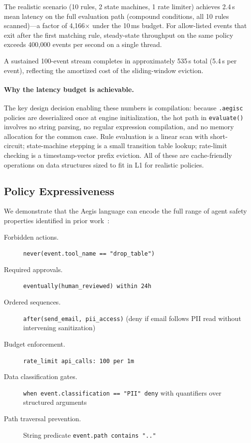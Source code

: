 \documentclass[sigconf]{acmart}
\begin{document}
The realistic scenario (10 rules, 2 state machines, 1 rate limiter) achieves
2.4\,\textmu s mean latency on the full evaluation path (compound conditions,
all 10 rules scanned)---a factor of 4,166$\times$ under the 10\,ms budget.
For allow-listed events that exit after the first matching rule, steady-state
throughput on the same policy exceeds 400{,}000 events per second on a single
thread.

A sustained 100-event stream completes in approximately 535\,\textmu s total
(5.4\,\textmu s per event), reflecting the amortized cost of the sliding-window
eviction.

\paragraph{Why the latency budget is achievable.}
The key design decision enabling these numbers is compilation: because
\texttt{.aegisc} policies are deserialized once at engine initialization, the
hot path in \texttt{evaluate()} involves no string parsing, no regular
expression compilation, and no memory allocation for the common case. Rule
evaluation is a linear scan with short-circuit; state-machine stepping is
a small transition table lookup; rate-limit checking is a timestamp-vector
prefix eviction. All of these are cache-friendly operations on data structures
sized to fit in L1 for realistic policies.

\subsection{Policy Expressiveness}

We demonstrate that the Aegis language can encode the full range of agent
safety properties identified in prior work~\cite{greshake2023not,
perez2022ignore}:

\begin{description}
  \item[Forbidden actions.] \texttt{never(event.tool\_name == "drop\_table")}
  \item[Required approvals.] \texttt{eventually(human\_reviewed) within 24h}
  \item[Ordered sequences.] \texttt{after(send\_email, pii\_access)} (deny
    if email follows PII read without intervening sanitization)
  \item[Budget enforcement.] \texttt{rate\_limit api\_calls: 100 per 1m}
  \item[Data classification gates.] \texttt{when event.classification == "PII"
    deny} with quantifiers over structured arguments
  \item[Path traversal prevention.] String predicate \texttt{event.path
    contains ".."}
\end{description}
\end{document}
